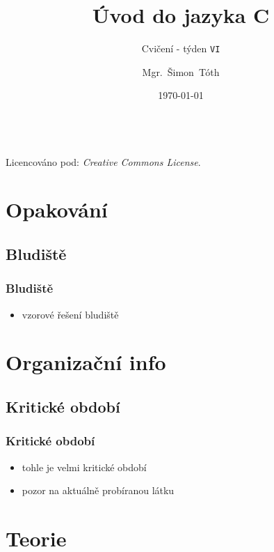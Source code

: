

\title{Úvod do jazyka C}
\subtitle{Cvičení - týden \texttt{VI}}
\author[]{Mgr.~Šimon~Tóth}
\date{\today}

\newcommand{\CcNote}[1]{%
        Licencováno pod: \textit{Creative Commons #1 3.0 License}.%
}


	\begin{frame}
		\titlepage
		\vfill
		\begin{center}
			\\
			{\tiny\CcNote{\CcLongnameByNcSa}}
			\vspace*{2ex}
		\end{center}
	\end{frame}

\section{Opakování}
\subsection{Bludiště}

\begin{frame}
	\frametitle{Bludiště}
	\begin{itemize}
		\item{vzorové řešení bludiště}
	\end{itemize}
\end{frame}

\section{Organizační info}
\subsection{Kritické období}

\begin{frame}
	\frametitle{Kritické období}
	\begin{itemize}
		\item{tohle je velmi kritické období}
		\item{pozor na aktuálně probíranou látku}
	\end{itemize}
\end{frame}

\section{Teorie}
